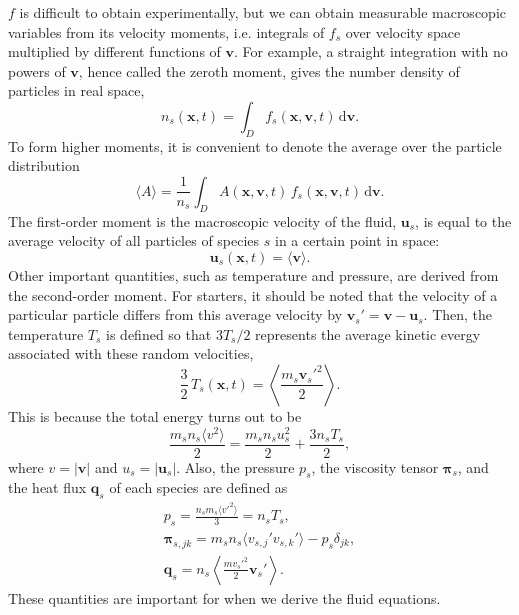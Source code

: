 \documentclass{article}
\begin{document}
$f$ is difficult to obtain experimentally, but we can obtain measurable macroscopic variables from its velocity moments, i.e. integrals of $f_s$ over velocity space multiplied by different functions of $\bm{v}$. For example, a straight integration with no powers of $\bm{v}$, hence called the zeroth moment, gives the number density of particles in real space,
%
\begin{equation}
    n_s(\bm{x}, t) = \int_D f_s(\bm{x}, \bm{v}, t) \, \mathrm{d}\bm{v} .
\end{equation}
%
To form higher moments, it is convenient to denote the average over the particle distribution
%
\begin{equation}
    \langle A \rangle = \frac{1}{n_s} \int_D A(\bm{x}, \bm{v}, t) \, f_s(\bm{x}, \bm{v}, t) \, \mathrm{d}\bm{v} .
\end{equation}
%
The first-order moment is the macroscopic velocity of the fluid, $\bm{u}_s$, is equal to the average velocity of all particles of species $s$ in a certain point in space:
%
\begin{equation}
    \bm{u}_s(\bm{x}, t) = \langle \bm{v} \rangle .
\end{equation}
%
Other important quantities, such as temperature and pressure, are derived from the second-order moment. For starters, it should be noted that the velocity of a particular particle differs from this average velocity by $\bm{v}_s' = \bm{v} - \bm{u}_s$. Then, the temperature $T_s$ is defined so that $3T_s/2$ represents the average kinetic evergy associated with these random velocities,
%
\begin{equation}
    \frac{3}{2} \, T_s(\bm{x}, t) = \left\langle \frac{m_s \bm{v}_s'^2}{2} \right\rangle .
\end{equation}
%
This is because the total energy turns out to be
%
\begin{equation}
    \frac{m_s n_s \langle v^2 \rangle}{2} = \frac{m_s n_s u_s^2}{2} + \frac{3 n_s T_s}{2} ,
\end{equation}
%
where $v = |\bm{v}|$ and $u_s = |\bm{u}_s|$. Also, the pressure $p_s$, the viscosity tensor $\bm{\pi}_s$, and the heat flux $\bm{q}_s$ of each species are defined as
%
\begin{gather}
    p_s = \frac{n_s m_s \langle v'^2 \rangle}{3} = n_s T_s , \\
    \bm{\pi}_{s,jk} = m_s n_s \langle v_{s,j}'v_{s,k}' \rangle - p_s \delta_{jk} , \\
    \bm{q}_s = n_s \left\langle \frac{m v_s'^2}{2} \bm{v}_s' \right\rangle .
\end{gather}
%
These quantities are important for when we derive the fluid equations.
\end{document}

